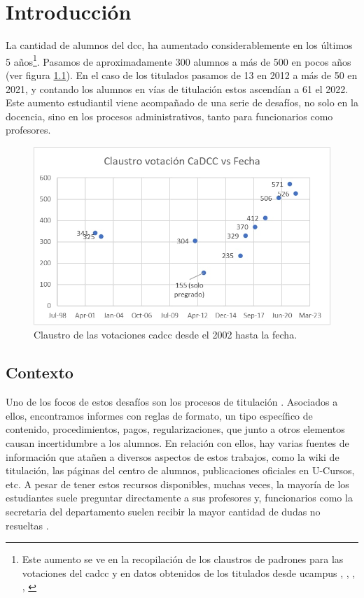 \chapter{Introducción}\label{chap:intro}

    \par  La cantidad de alumnos del \acrfull{dcc}, ha aumentado considerablemente en los últimos 5 años\footnote{Este aumento se ve en la recopilación de los claustros de padrones para las votaciones del \acrshort{cadcc} y en datos obtenidos de los titulados desde ucampus \cite{CADCC2002}, \cite{CADCC2016}, \cite{CADCC2018}, \cite{CADCC2021}, \cite{CADCC2022}}. Pasamos de aproximadamente 300 alumnos a más de 500 en pocos años (ver figura \ref{fig:aumento_alumnos}). En el caso de los titulados pasamos de 13 en 2012 a más de 50 en 2021, y contando los alumnos en vías de titulación estos ascendían a 61 el 2022. Este aumento estudiantil viene acompañado de una serie de desafíos, no solo en la docencia, sino en los procesos administrativos, tanto para funcionarios como profesores.

    \begin{figure}[h]
        \centering
        \includegraphics[scale=0.6]{media/imagenes/claustro_votacion_cadcc.jpg}
        \caption[Claustro votaciones \acrshort{cadcc}]{Claustro de las votaciones cadcc desde el 2002 hasta la fecha.}
        \label{fig:aumento_alumnos}
    \end{figure}

\section{Contexto}\label{sec:intro-con}
    \par Uno de los focos de estos desafíos son los procesos de titulación \cite{ARANCIBIA2021}. Asociados a ellos, encontramos informes con reglas de formato, un tipo específico de contenido, procedimientos, pagos, regularizaciones, que junto a otros elementos causan incertidumbre a los alumnos. En relación con ellos, hay varias fuentes de información que atañen a diversos aspectos de estos trabajos, como la wiki de titulación, las páginas del centro de alumnos, publicaciones oficiales en U-Cursos, etc. A pesar de tener estos recursos disponibles, muchas veces, la mayoría de los estudiantes suele preguntar directamente a sus profesores y, funcionarios como la secretaria del departamento suelen recibir la mayor cantidad de dudas no resueltas \cite{ARANCIBIA2021}.
    
